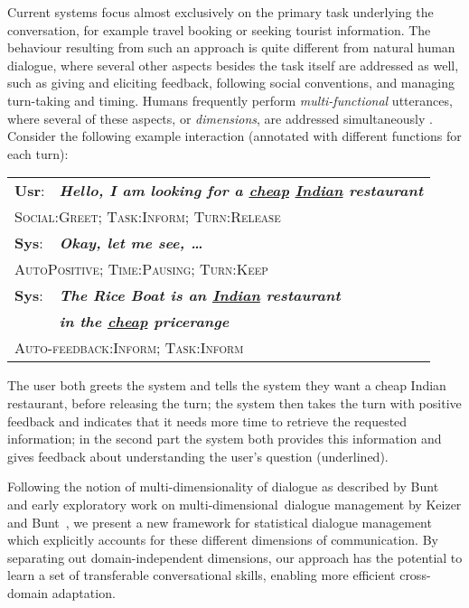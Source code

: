 \documentclass[11pt]{article}
\def\mdim{multi\hyp dimensional}
\begin{document}
Current systems focus almost exclusively on the primary task underlying the conversation, for example travel booking or seeking tourist information.  The behaviour resulting from such an approach is quite different from natural human dialogue, where several other aspects besides the task itself are addressed as well, such as giving and eliciting feedback, following social conventions, and managing turn-taking and timing.  Humans frequently perform \emph{multi-functional} utterances, where several of these aspects, or \emph{dimensions}, are addressed simultaneously \cite{Bunt:2011et}.  Consider the following example interaction (annotated with different functions for each turn):
%
\begin{center}
\small
\begin{tabular}{@{}l@{\;}l@{}}
\toprule
\textbf{Usr}: & \textsl{\textbf{Hello, I am looking for a \underline{cheap} \underline{Indian} restaurant}} \\[1mm]
\multicolumn{2}{l}{\hspace{3mm}\textsc{Social:Greet; Task:Inform; Turn:Release}} \\[2mm]
\midrule
\textbf{Sys}: & \textsl{\textbf{Okay, let me see, \dots}} \\
\multicolumn{2}{l}{\hspace{3mm}\textsc{AutoPositive; Time:Pausing; Turn:Keep}} \\[2mm]
\textbf{Sys}: & \textsl{\textbf{The Rice Boat is an \underline{Indian} restaurant}} \\[1mm]
                 & \hspace{3mm}\textsl{\textbf{in the \underline{cheap} pricerange}} \\[2mm]
\multicolumn{2}{l}{\hspace{3mm}\textsc{Auto-feedback:Inform; Task:Inform}} \\
\bottomrule
\end{tabular}
\end{center}
%
The user both greets the system and tells the system they want a cheap Indian restaurant, before releasing the turn; the system then takes the turn with positive feedback and indicates that it needs more time to retrieve the requested information; in the second part the system both provides this information and gives feedback about understanding the user's question (underlined).

Following the notion of multi-dimensionality of dialogue as described by Bunt~ and early exploratory work on \mdim\ dialogue management by Keizer and Bunt~, we present a new framework for statistical dialogue management which explicitly accounts for these different dimensions of communication.  By separating out domain-independent dimensions, our approach has the potential to learn a set of transferable conversational skills, enabling more efficient cross-domain adaptation.  
\end{document}
